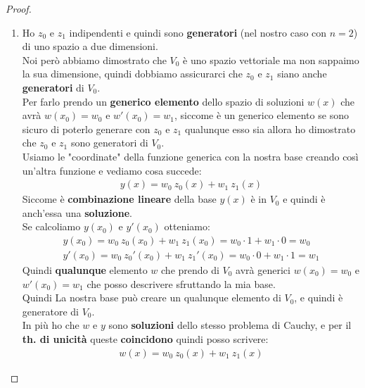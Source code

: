 \documentclass[a4paper, oneside]{article}
\begin{document}
\begin{theorem}
\begin{proof}
\begin{enumerate}
                    \item Ho $z_0$ e $z_1$ indipendenti e quindi sono \textbf{generatori} (nel nostro caso con $n=2$) di uno spazio a due dimensioni.\\
                    Noi però abbiamo dimostrato che $V_0$ è uno spazio vettoriale ma non sappaimo la sua dimensione, quindi dobbiamo assicurarci che $z_0$ e $z_1$ siano anche \textbf{generatori} di $V_0$.\\
                    Per farlo prendo un \textbf{generico elemento} dello spazio di soluzioni $w(x)$ che avrà $w(x_0) = w_0$ e $w'(x_0) = w_1$, siccome è un generico elemento se sono sicuro di poterlo generare con $z_0$ e $z_1$ qualunque esso sia allora 
                    ho dimostrato che $z_0$ e $z_1$ sono generatori di $V_0$.\\
                    Usiamo le "coordinate" della funzione generica con la nostra base creando così un'altra funzione e vediamo cosa succede:
                    \begin{gather*}
                        y(x) = w_0 \ z_0(x) + w_1 \ z_1(x)
                    \end{gather*}
                    Siccome è \textbf{combinazione lineare} della base $y(x)$ è in $V_0$ e quindi è anch'essa una \textbf{soluzione}.\\
                    Se calcoliamo $y(x_0)$ e $y'(x_0)$ otteniamo:
                    \begin{gather*}
                        y(x_0) = w_0 \ z_0(x_0) + w_1 \ z_1(x_0) = w_0 \cdot 1 + w_1 \cdot 0 = w_0\\
                        y'(x_0) = w_0 \ z_0'(x_0) + w_1 \ z_1'(x_0) = w_0 \cdot 0 + w_1 \cdot 1 = w_1
                    \end{gather*}
                    Quindi \textbf{qualunque} elemento $w$ che prendo di $V_0$ avrà generici $w(x_0) = w_0$ e $w'(x_0) = w_1$ che posso descrivere sfruttando la mia base.\\
                    Quindi La nostra base può creare un qualunque elemento di $V_0$, e quindi è generatore di $V_0$.\\
                    In più ho che $w$ e $y$ sono \textbf{soluzioni} dello stesso problema di Cauchy, e per il \textbf{th. di unicità} queste \textbf{coincidono} quindi posso scrivere:
                    \begin{gather*}
                        w(x) = w_0 \ z_0(x) + w_1 \ z_1(x)
                    \end{gather*}
                \end{enumerate}


\end{proof}
\end{theorem}
\end{document}
